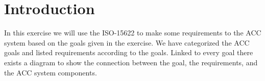 \section{Introduction}

In this exercise we will use the ISO-15622 to make some requirements to the ACC system based 
on the goals given in the exercise. We have categorized the ACC goals and listed requirements 
according to the goals. Linked to every goal there exists a diagram to show the connection 
between the goal, the requirements, and the ACC system components. 